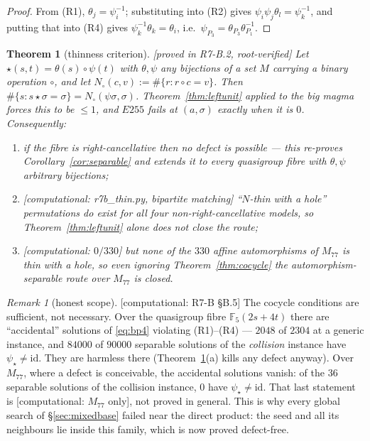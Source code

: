 \documentclass[11pt]{article}
\theoremstyle{plain}
\newtheorem{theorem}{Theorem}[section]
\theoremstyle{definition}
\theoremstyle{remark}
\newtheorem*{remark*}{Remark}
\numberwithin{equation}{section}
\newcommand{\F}{\mathbb{F}}
\newcommand{\statusbox}[1]{{\small\sloppy\textsf{[#1]}}}
\newcommand{\PROVED}[1]{\statusbox{proved in #1, root-verified}}
\newcommand{\COMP}[1]{\statusbox{computational: #1}}
\begin{document}
\begin{proof}
From (R1), $\theta_j = \psi_i^{-1}$; substituting into (R2) gives
$\psi_i\psi_j\theta_l = \psi_k^{-1}$, and putting that into (R4) gives
$\psi_k^{-1}\theta_k = \theta_i$, i.e.\ $\psi_{P_3} = \theta_{P_3}\theta_{P_1}^{-1}$.
\end{proof}

\begin{theorem}[thinness criterion]\label{thm:thin}
\PROVED{R7-B.2}
Let $\star(s,t) = \theta(s)\circ\psi(t)$ with $\theta,\psi$ \emph{any} bijections
of a set $M$ carrying a binary operation $\circ$, and let
$N_\circ(c,v) := \#\{r : r\circ c = v\}$. Then
$\#\{s : s\star\sigma = \sigma\} = N_\circ(\psi\sigma,\sigma)$.
Theorem~\ref{thm:leftunit} applied to the big magma forces this to be $\le1$, and
$E255$ fails at $(a,\sigma)$ exactly when it is $0$. Consequently:
\begin{enumerate}
\item[(a)] if the fibre is right-cancellative then no defect is possible --- this
re-proves Corollary~\ref{cor:separable} and extends it to \emph{every quasigroup
fibre} with $\theta,\psi$ arbitrary bijections;
\item[(b)] \COMP{r7b\_thin.py, bipartite matching} ``$N$-thin with a hole''
permutations do exist for all four non-right-cancellative models, so
Theorem~\ref{thm:leftunit} alone does not close the route;
\item[(c)] \COMP{$0/330$} but \emph{none} of the $330$ affine automorphisms of
$M_{77}$ is thin with a hole, so even ignoring Theorem~\ref{thm:cocycle} the
automorphism-separable route over $M_{77}$ is closed.
\end{enumerate}
\end{theorem}

\begin{remark*}[honest scope]
\COMP{R7-B \S B.5}
The cocycle conditions are sufficient, not necessary. Over the quasigroup fibre
$\F_5(2s+4t)$ there are ``accidental'' solutions of \eqref{eq:bp4} violating
(R1)--(R4) --- $2048$ of $2304$ at a generic instance, and $84000$ of $90000$
separable solutions of the \emph{collision} instance have $\psi_\star\ne\mathrm{id}$.
They are harmless there (Theorem~\ref{thm:thin}(a) kills any defect anyway). Over
$M_{77}$, where a defect is conceivable, the accidental solutions vanish: of the
$36$ separable solutions of the collision instance, $0$ have
$\psi_\star\ne\mathrm{id}$. That last statement is \COMP{$M_{77}$ only}, not proved
in general. This is why every global search of \S\ref{sec:mixedbase} failed near
the direct product: the seed and all its neighbours lie inside this family, which
is now proved defect-free.
\end{remark*}
\end{document}
